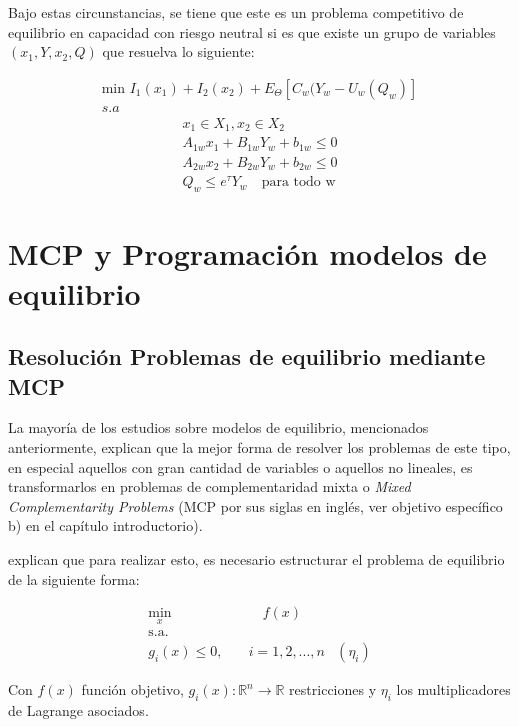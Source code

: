 Bajo estas circunstancias, se tiene que este es un problema competitivo de equilibrio en capacidad con riesgo neutral si es que existe un grupo de variables $(x_{1}, Y, x_{2}, Q)$ que resuelva lo siguiente: 

\begin{align}
 \text{min } I_{1}(x_{1})+ I_{2}(x_{2})+E_{\Theta}[C_{w}(Y_{w}-U_{w}(Q_{w})] \\
s.a
\end{align}
\begin{align}
 x_{1} \in X_{1} ,x_{2} \in X_{2}\\
A_{1w}x_{1}+B_{1w}Y_{w}+b_{1w} \le 0 \\
A_{2w}x_{2}+B_{2w}Y_{w}+b_{2w} \le 0 \\
Q_{w}\le e^{\tau}Y_{w}\text{  }\text{ para todo w}
\end{align}




\section{MCP y Programación modelos de equilibrio}

\subsection{Resolución Problemas de equilibrio mediante MCP}\label{descripcionkkt}

La mayoría de los estudios sobre modelos de equilibrio, mencionados anteriormente, explican que la mejor forma de resolver los problemas de este tipo, en especial aquellos con gran cantidad de variables o aquellos no lineales, es transformarlos en problemas de complementaridad mixta o \textit{Mixed Complementarity Problems} (MCP por sus siglas en inglés, ver objetivo específico b) en el capítulo introductorio).
\vspace{2.5mm}

 explican que para realizar esto, es necesario estructurar el problema de equilibrio de la siguiente forma:

\begin{align}
    \min_{x} & \quad f(x) \label{foej1}\\ 
    \textrm{s.a.} \nonumber\\
    g_{i}(x) \leq 0 ,\quad & i=1,2,...,n  &(\eta_{i}) \label{resej1} 
\end{align}

Con $f(x)$ función objetivo,  $g_{i}(x):\mathbb{R}^n \rightarrow \mathbb{R}$ restricciones y $\eta_i$ los multiplicadores de Lagrange asociados. 
\vspace{2.5mm}

